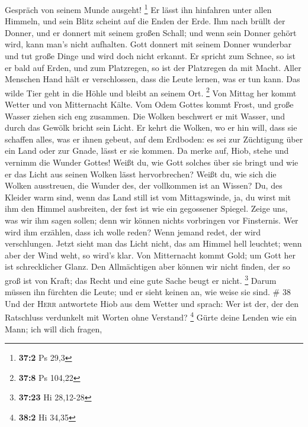 Gespräch von seinem Munde ausgeht! \footnote{\textbf{37:2} Ps 29,3}
 Er lässt ihn hinfahren unter allen Himmeln, und sein
Blitz scheint auf die Enden der Erde.  Ihm nach brüllt der
Donner, und er donnert mit seinem großen Schall; und wenn sein Donner
gehört wird, kann man's nicht aufhalten.  Gott donnert mit
seinem Donner wunderbar und tut große Dinge und wird doch nicht erkannt.
 Er spricht zum Schnee, so ist er bald auf Erden, und zum
Platzregen, so ist der Platzregen da mit Macht.  Aller
Menschen Hand hält er verschlossen, dass die Leute lernen, was er tun
kann.  Das wilde Tier geht in die Höhle und bleibt an
seinem Ort. \footnote{\textbf{37:8} Ps 104,22}  Von Mittag
her kommt Wetter und von Mitternacht Kälte.  Vom Odem
Gottes kommt Frost, und große Wasser ziehen sich eng zusammen.
 Die Wolken beschwert er mit Wasser, und durch das Gewölk
bricht sein Licht.  Er kehrt die Wolken, wo er hin will,
dass sie schaffen alles, was er ihnen gebeut, auf dem Erdboden:
 es sei zur Züchtigung über ein Land oder zur Gnade,
lässt er sie kommen.  Da merke auf, Hiob, stehe und
vernimm die Wunder Gottes!  Weißt du, wie Gott solches
über sie bringt und wie er das Licht aus seinen Wolken lässt
hervorbrechen?  Weißt du, wie sich die Wolken ausstreuen,
die Wunder des, der vollkommen ist an Wissen?  Du, des
Kleider warm sind, wenn das Land still ist vom Mittagswinde,
 ja, du wirst mit ihm den Himmel ausbreiten, der fest ist
wie ein gegossener Spiegel.  Zeige uns, was wir ihm sagen
sollen; denn wir können nichts vorbringen vor Finsternis.
 Wer wird ihm erzählen, dass ich wolle reden? Wenn jemand
redet, der wird verschlungen.  Jetzt sieht man das Licht
nicht, das am Himmel hell leuchtet; wenn aber der Wind weht, so wird's
klar.  Von Mitternacht kommt Gold; um Gott her ist
schrecklicher Glanz.  Den Allmächtigen aber können wir
nicht finden, der so groß ist von Kraft; das Recht und eine gute Sache
beugt er nicht. \footnote{\textbf{37:23} Hi 28,12-28} 
Darum müssen ihn fürchten die Leute; und er sieht keinen an, wie weise
sie sind. \# 38  Und der \textsc{Herr} antwortete Hiob aus
dem Wetter und sprach:  Wer ist der, der den Ratschluss
verdunkelt mit Worten ohne Verstand? \footnote{\textbf{38:2} Hi 34,35}
 Gürte deine Lenden wie ein Mann; ich will dich fragen,

